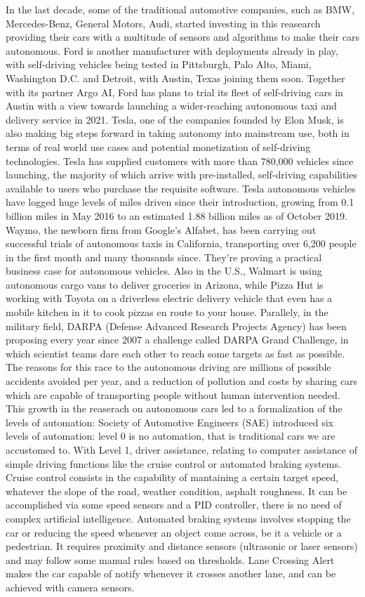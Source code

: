 In the last decade, some of the traditional automotive companies, such as BMW, Mercedes-Benz, General Motors, Audi, started investing in this reasearch providing their cars with a multitude of sensors and algorithms to make their cars autonomous. Ford is another manufacturer with deployments already in play, with self-driving vehicles being tested in Pittsburgh, Palo Alto, Miami, Washington D.C. and Detroit, with Austin, Texas joining them soon. Together with its partner Argo AI, Ford has plans to trial its fleet of self-driving cars in Austin with a view towards launching a wider-reaching autonomous taxi and delivery service in 2021.
Tesla, one of the companies founded by Elon Musk, is also making big steps forward in taking autonomy into mainstream use, both in terms of real world use cases and potential monetization of self-driving technologies. Tesla has supplied customers with more than 780,000 vehicles since launching, the majority of which arrive with pre-installed, self-driving capabilities available to users who purchase the requisite software. Tesla autonomous vehicles have logged huge levels of miles driven since their introduction, growing from 0.1 billion miles in May 2016 to an estimated 1.88 billion miles as of October 2019.
Waymo, the newborn firm from Google's Alfabet, has been carrying out successful trials of autonomous taxis in California, transporting over 6,200 people in the first month and many thousands since. They're proving a practical business case for autonomous vehicles.
Also in the U.S., Walmart is using autonomous cargo vans to deliver groceries in Arizona, while Pizza Hut is working with Toyota on a driverless electric delivery vehicle that even has a mobile kitchen in it to cook pizzas en route to your house.
Parallely, in the military field, DARPA (Defense Advanced Research Projects Agency) has been proposing every year since 2007 a challenge called DARPA Grand Challenge, in which scientist teams dare each other to reach some targets as fast as possible.
The reasons for this race to the autonomous driving are millions of possible accidents avoided per year, and a reduction of pollution and costs by sharing cars which are capable of transporting people without human intervention needed. %
This growth in the reaserach on autonomous cars led to a formalization of the levels of automation: Society of Automotive Engineers (SAE) introduced six levels of automation: level 0 is no automation, that is traditional cars we are accustomed to. With Level 1, driver assistance, relating to computer assistance of simple driving functions like the cruise control or automated braking systems. Cruise control consists in the capability of mantaining a certain target speed, whatever the slope of the road, weather condition, asphalt roughness. It can be accomplished via some speed sensors and a PID controller, there is no need of complex artificial intelligence. Automated braking systems involves stopping the car or reducing the speed whenever an object come across, be it a vehicle or a pedestrian. It requires proximity and distance sensors (ultrasonic or laser sensors) and may follow some manual rules based on thresholds. Lane Crossing Alert makes the car capable of notify whenever it crosses another lane, and can be achieved with camera sensors.
